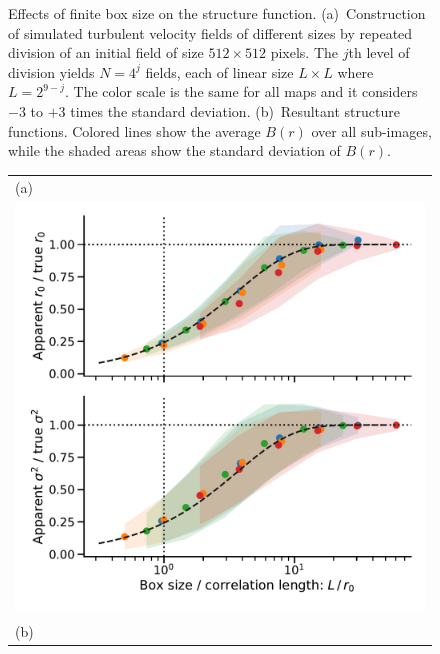 \documentclass[fleqn,usenatbib, useAMS, a4paper]{mnras}
\begin{document}
\begin{figure}
\begin{tabular}{@{} l @{}}
  \end{tabular}
  \caption{Effects of finite box size on the structure function.
    (a)~Construction of simulated turbulent velocity fields of different sizes
    by repeated division of an initial field of size \(512 \times 512\) pixels.
    The \(j\)th level of division yields \(N = 4^j\) fields,
    each of linear size \(L \times L\) where \(L = 2^{9 - j}\).
    The color scale is the same for all maps and it considers \(- 3\) to \(+ 3\) times the standard deviation.
    (b)~Resultant structure functions.
    Colored lines show the average \(B(r)\) over all sub-images,
    while the shaded areas show the standard deviation of \(B(r)\).
  }
  \label{fig:finite-box}
\end{figure}

\begin{figure}
  \begin{tabular}{@{} l @{}}
    (a)\\
    \includegraphics[width=0.95\linewidth]{Figures/fake-finite-box-effect}
    \\[\bigskipamount]
    (b)\\

\end{tabular}
\end{figure}
\end{document}
